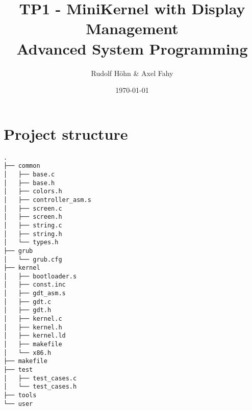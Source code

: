 \documentclass[a4paper]{article}
\title{TP1 - MiniKernel with Display Management\\Advanced System Programming}
\author{Rudolf Höhn \& Axel Fahy}
\date{\today}
\begin{document}
\maketitle

\section{Project structure}
\begin{verbatim}
.
├── common
│   ├── base.c
│   ├── base.h
│   ├── colors.h
│   ├── controller_asm.s
│   ├── screen.c
│   ├── screen.h
│   ├── string.c
│   ├── string.h
│   └── types.h
├── grub
│   └── grub.cfg
├── kernel
│   ├── bootloader.s
│   ├── const.inc
│   ├── gdt_asm.s
│   ├── gdt.c
│   ├── gdt.h
│   ├── kernel.c
│   ├── kernel.h
│   ├── kernel.ld
│   ├── makefile
│   └── x86.h
├── makefile
├── test
│   ├── test_cases.c
│   └── test_cases.h
├── tools
└── user

\end{verbatim}
\end{document}
